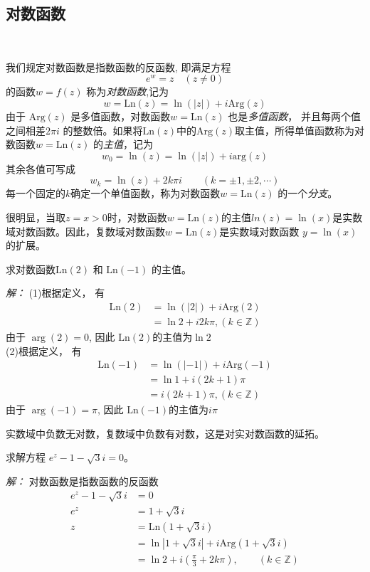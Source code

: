 \subsection{对数函数}
~\\
\begin{definition}
  我们规定对数函数是指数函数的反函数, 即满足方程$$e^w = z \quad (z\ne 0)$$的函数$w = f(z)$ 称为\emph{对数函数},记为 
  \begin{equation}
    w = \text{Ln}(z) = \ln(|z|) + i \text{Arg}(z)
  \end{equation}
  由于 $\text{Arg}(z)$ 是多值函数，对数函数$  w = \text{Ln}(z)$ 也是\emph{多值函数}， 并且每两个值之间相差$2 \pi i$ 的整数倍。如果将$\text{Ln}(z)$中的$\text{Arg}(z)$取主值，所得单值函数称为对数函数$  w = \text{Ln}(z)$ 的\emph{主值}，记为
  \[ w_0 = \ln(z) = \ln(|z|) + i \text{arg}(z)\]
  其余各值可写成 
  \[ w_k = \ln(z) + 2k \pi i \qquad (k = \pm 1, \pm 2, \cdots)\]
  每一个固定的$k$确定一个单值函数，称为对数函数$  w = \text{Ln}(z)$ 的一个\emph{分支}。
\end{definition}
很明显，当取$z=x>0$时，对数函数$w = \text{Ln}(z)$的主值$ln(z) = \ln(x)$是实数域对数函数。因此，复数域对数函数$w = \text{Ln}(z)$是实数域对数函数 $y = \ln(x)$的扩展。

\begin{example}
  求对数函数$\text{Ln}(2)$ 和 $\text{Ln}(-1)$ 的主值。
\end{example}
\emph{解：} (1)根据定义， 有
\[ \begin{aligned}
  \text{Ln}(2) & = \ln(|2|) + i \text{Arg}(2) \\
  & = \ln 2 + i 2k \pi , (k \in \mathbb{Z})
\end{aligned}\]
由于 $\arg(2) =0$, 因此 $\text{Ln}(2)$的主值为$\ln 2$ \\
(2)根据定义， 有
\[ \begin{aligned}
  \text{Ln}(-1) & = \ln(|-1|) + i \text{Arg}(-1) \\
  & = \ln 1 + i (2k +1) \pi  \\
  & = i (2k +1) \pi , (k \in \mathbb{Z}) 
\end{aligned}\]
由于 $\arg(-1) =\pi $, 因此 $\text{Ln}(-1)$的主值为$i \pi $ \\
\begin{hint}
  实数域中负数无对数，复数域中负数有对数，这是对实对数函数的延拓。
\end{hint}

\begin{example}
  求解方程 $ e^z -1 - \sqrt{3} i =0$。
\end{example}
\emph{解：} 对数函数是指数函数的反函数 
\[ \begin{aligned}
  e^z -1 - \sqrt{3} i & =0 \\
  e^z & = 1 + \sqrt{3} i \\
   z &= \text{Ln}(1 + \sqrt{3} i ) \\
     & = \ln |1 + \sqrt{3} i | + i \text{Arg}(1 + \sqrt{3} i ) \\
     & = \ln 2 + i \left(\frac{\pi}{3} + 2 k \pi \right), \qquad (k \in \mathbb{Z})
\end{aligned}\]


